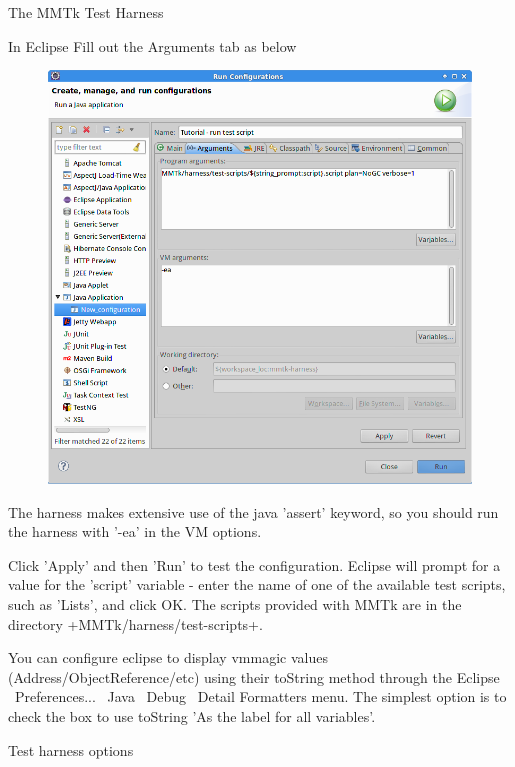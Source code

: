 \begin{section}{The MMTk Test Harness}
\begin{subsection}{In Eclipse}
Fill out the Arguments tab as below 

\begin{figure}[H]
  \centering
  \includegraphics[width=\textwidth]{images/TheMMTkTestHarness-ArgumentsTab.png}
\end{figure}

The harness makes extensive use of the java 'assert' keyword, so you should run the harness with '-ea' in the VM options.

Click 'Apply' and then 'Run' to test the configuration.  Eclipse will prompt for a value for the 'script' variable - enter the name of one of the available test scripts, such as 'Lists', and click OK.  The scripts provided with MMTk are in the directory \spverb+MMTk/harness/test-scripts+.

You can configure eclipse to display vmmagic values (Address/ObjectReference/etc) using their toString method through the Eclipse \textrightarrow\ Preferences... \textrightarrow\ Java \textrightarrow\ Debug \textrightarrow\ Detail Formatters menu. The simplest option is to check the box to use toString 'As the label for all variables'.

\end{subsection}

\begin{subsection}{Test harness options}


\end{subsection}
\end{section}
